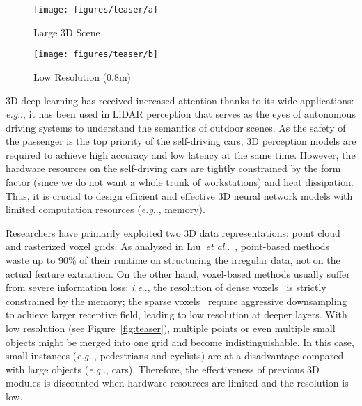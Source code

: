 \documentclass[runningheads]{llncs}
\makeatletter
\newcommand{\fig}[1]{Figure~\ref{#1}}
\DeclareRobustCommand\onedot{\futurelet\@let@token\@onedot}
\def\@onedot{\ifx\@let@token.\else.\null\fi\xspace}
\def\eg{\emph{e.g}\onedot} \def\Eg{\emph{E.g}\onedot}
\def\ie{\emph{i.e}\onedot} \def\Ie{\emph{I.e}\onedot}
\def\etal{\emph{et al}\onedot}
\makeatother
\begin{document}
\begin{figure*}[t]
\centering
\begin{subfigure}[t]{0.48\linewidth}
    \centering
    \texttt{[image: figures/teaser/a]}
    \caption{Large 3D Scene}
    \label{fig:teaser:a}
\end{subfigure}
\begin{subfigure}[t]{0.48\linewidth}
    \centering
    \texttt{[image: figures/teaser/b]}
    \caption{Low Resolution (0.8m)}
    \label{fig:teaser:b}
\end{subfigure}
\caption{Small instances (e.g., pedestrians and cyclists) are hard to be recognized at a low resolution (due to the coarse voxelization or the aggressive downsampling).}
\label{fig:teaser}
\end{figure*} 
3D deep learning has received increased attention thanks to its wide applications: \eg, it has been used in LiDAR perception that serves as the eyes of autonomous driving systems to understand the semantics of outdoor scenes. As the safety of the passenger is the top priority of the self-driving cars, 3D perception models are required to achieve high accuracy and low latency at the same time. However, the hardware resources on the self-driving cars are tightly constrained by the form factor (since we do not want a whole trunk of workstations) and heat dissipation. Thus, it is crucial to design efficient and effective 3D neural network models with limited computation resources (\eg, memory).

Researchers have primarily exploited two 3D data representations: point cloud and rasterized voxel grids. As analyzed in Liu~\etal~\cite{liu2019point}, point-based methods~\cite{qi2017pointnet,qi2017pointnet++,li2018pointcnn} waste up to 90\% of their runtime on structuring the irregular data, not on the actual feature extraction. On the other hand, voxel-based methods usually suffer from severe information loss: \ie, the resolution of dense voxels~\cite{maturana2015voxnet,liu2019point} is strictly constrained by the memory; the sparse voxels~\cite{graham20183d,choy20194d} require aggressive downsampling to achieve larger receptive field, leading to low resolution at deeper layers. With low resolution (see \fig{fig:teaser}), multiple points or even multiple small objects might be merged into one grid and become indistinguishable. In this case, small instances (\eg, pedestrians and cyclists) are at a disadvantage compared with large objects (\eg, cars). Therefore, the effectiveness of previous 3D modules is discounted when hardware resources are limited and the resolution is low.
\end{document}

